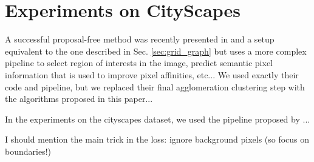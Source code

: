 \section{Experiments on CityScapes}
A successful proposal-free method was recently presented in \cite{liu2018affinity} and a setup equivalent to the one described in Sec. \ref{sec:grid_graph} but uses a more complex pipeline to select region of interests in the image, predict semantic pixel information that is used to improve pixel affinities, etc... We used exactly their code and pipeline, but we replaced their final agglomeration clustering step with the algorithms proposed in this paper...

In the experiments on the cityscapes dataset, we used the pipeline proposed by \cite{liu2018affinity} ...

I should mention the main trick in the loss: ignore background pixels (so focus on boundaries!)




